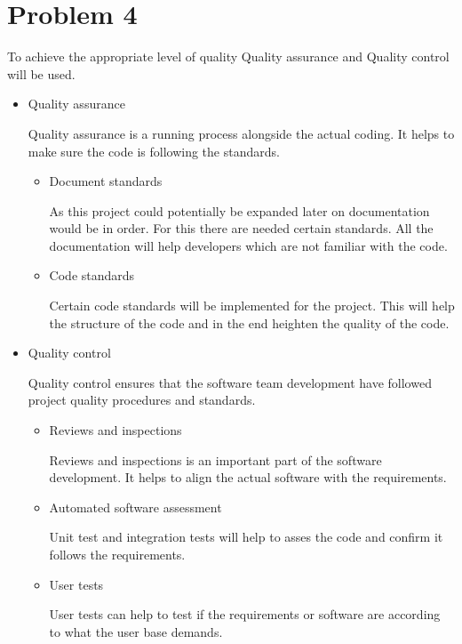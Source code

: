 \chapter{Problem 4}
To achieve the appropriate level of quality Quality assurance and Quality control will be used.
\begin{itemize}
	\setlength\itemsep{0.1em}
	\item Quality assurance	
	
		Quality assurance is a running process alongside the actual coding. It helps to make sure the code is following the standards.
	\begin{itemize}
		\item Document standards
		
			As this project could potentially be expanded later on documentation would be in order. For this there are needed certain standards. All the documentation will help developers which are not familiar with the code.  
		\item Code standards
		
			Certain code standards will be implemented for the project. This will help the structure of the code and in the end heighten the quality of the code. 
	\end{itemize}
	\item Quality control
		
		Quality control ensures that the software team development have followed project quality procedures and standards.
	\begin{itemize}
		\item Reviews and inspections
		
			Reviews and inspections is an important part of the software development. It helps to align the actual software with the requirements.
		\item Automated software assessment
		
			Unit test and integration tests will help to asses the code and confirm it follows the requirements.
		\item User tests
			
			User tests can help to test if the requirements or software are according to what the user base demands. 
	\end{itemize}
\end{itemize}
